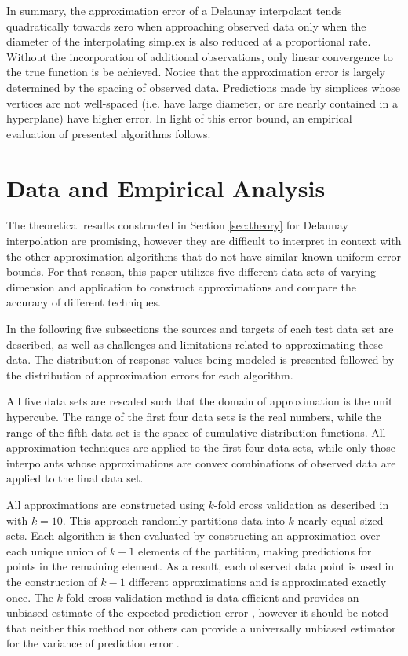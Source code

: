 \documentclass[smallextended,final]{svjour3}       %
\begin{document}
In summary, the approximation error of a Delaunay interpolant tends
quadratically towards zero when approaching observed data only when
the diameter of the interpolating simplex is also reduced at a
proportional rate. Without the incorporation of additional
observations, only linear convergence to the true function is be
achieved. Notice that the approximation error is largely determined by
the spacing of observed data. Predictions made by simplices whose
vertices are not well-spaced (i.e. have large diameter, or are nearly
contained in a hyperplane) have higher error. In light of this error
bound, an empirical evaluation of presented algorithms follows.

\section{Data and Empirical Analysis}
\label{sec:data}

The theoretical results constructed in Section \ref{sec:theory} for
Delaunay interpolation are promising, however they are difficult to
interpret in context with the other approximation algorithms that do
not have similar known uniform error bounds. For that reason, this
paper utilizes five different data sets of varying dimension and
application to construct approximations and compare the accuracy of
different techniques.

In the following five subsections the sources and targets of each test
data set are described, as well as challenges and limitations related
to approximating these data. The distribution of response values being
modeled is presented followed by the distribution of approximation
errors for each algorithm.

All five data sets are rescaled such that the domain of approximation
is the unit hypercube. The range of the first four data sets is the
real numbers, while the range of the fifth data set is the space of
cumulative distribution functions. All approximation techniques are
applied to the first four data sets, while only those interpolants
whose approximations are convex combinations of observed data are
applied to the final data set.

All approximations are constructed using $k$-fold cross validation as
described in \cite{kohavi1995study} with $k=10$. This approach
randomly partitions data into $k$ nearly equal sized sets. Each
algorithm is then evaluated by constructing an approximation over each
unique union of $k-1$ elements of the partition, making predictions
for points in the remaining element. As a result, each observed data
point is used in the construction of $k-1$ different approximations
and is approximated exactly once. The $k$-fold cross validation method
is data-efficient and provides an unbiased estimate of the expected
prediction error \cite{kohavi1995study}, however it should be noted
that neither this method nor others can provide a universally unbiased
estimator for the variance of prediction error \cite{bengio2004no}.
\end{document}
